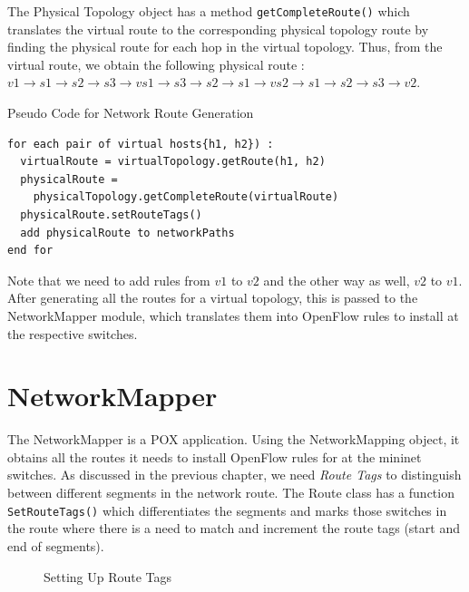 The Physical Topology object has a method \verb|getCompleteRoute()| which translates the virtual route to the corresponding physical topology route by finding the physical route for each hop in the virtual topology. Thus, from the virtual route, we obtain the following physical route : $v1 \rightarrow s1 \rightarrow s2 \rightarrow s3  \rightarrow vs1 \rightarrow s3 \rightarrow s2  \rightarrow s1 \rightarrow vs2 \rightarrow s1  \rightarrow s2 \rightarrow s3 \rightarrow v2$. \\
\begin{center}
	Pseudo Code for Network Route Generation
\end{center}
\begin{lstlisting}
for each pair of virtual hosts{h1, h2}) : 
  virtualRoute = virtualTopology.getRoute(h1, h2)
  physicalRoute = 
    physicalTopology.getCompleteRoute(virtualRoute)
  physicalRoute.setRouteTags()
  add physicalRoute to networkPaths
end for
\end{lstlisting}
Note that we need to add rules from $v1$ to $v2$ and the other way as well, $v2$ to $v1$. After generating all the routes for a virtual topology, this is passed to the NetworkMapper module, which translates them into OpenFlow rules to install at the respective switches. 

\section{NetworkMapper}
The NetworkMapper is a POX application. Using the NetworkMapping object, it obtains all the routes it needs to install OpenFlow rules for at the mininet switches. As discussed in the previous chapter, we need \emph{Route Tags} to distinguish between different segments in the network route. The Route class has a function \verb|SetRouteTags()| which differentiates the segments and marks those switches in the route where there is a need to match and increment the route tags (start and end of segments).  

\begin{figure}
	\noindent
	\caption{Setting Up Route Tags}
\end{figure}

